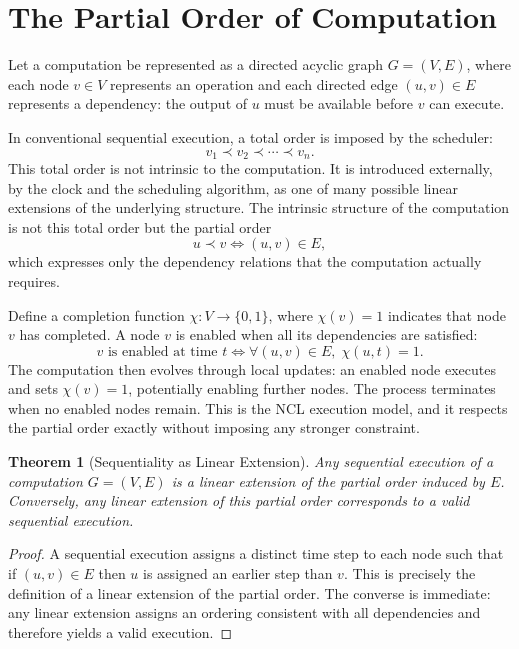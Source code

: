 \documentclass[12pt,a4paper,openany]{book}
\theoremstyle{plain}
\newtheorem{theorem}{Theorem}[chapter]
\theoremstyle{definition}
\theoremstyle{remark}
\begin{document}
\section{The Partial Order of Computation}

Let a computation be represented as a directed acyclic graph $G = (V, E)$, where each node $v \in V$ represents an operation and each directed edge $(u, v) \in E$ represents a dependency: the output of $u$ must be available before $v$ can execute.

In conventional sequential execution, a total order is imposed by the scheduler:
\[
v_1 \prec v_2 \prec \cdots \prec v_n.
\]
This total order is not intrinsic to the computation. It is introduced externally, by the clock and the scheduling algorithm, as one of many possible linear extensions of the underlying structure. The intrinsic structure of the computation is not this total order but the partial order
\[
u \prec v \iff (u, v) \in E,
\]
which expresses only the dependency relations that the computation actually requires.

Define a completion function $\chi : V \to \{0, 1\}$, where $\chi(v) = 1$ indicates that node $v$ has completed. A node $v$ is enabled when all its dependencies are satisfied:
\[
v \text{ is enabled at time } t \iff \forall (u, v) \in E,\; \chi(u, t) = 1.
\]
The computation then evolves through local updates: an enabled node executes and sets $\chi(v) = 1$, potentially enabling further nodes. The process terminates when no enabled nodes remain. This is the NCL execution model, and it respects the partial order exactly without imposing any stronger constraint.

\begin{theorem}[Sequentiality as Linear Extension]
\label{thm:linear_extension}
Any sequential execution of a computation $G = (V, E)$ is a linear extension of the partial order induced by $E$. Conversely, any linear extension of this partial order corresponds to a valid sequential execution.
\end{theorem}

\begin{proof}
A sequential execution assigns a distinct time step to each node such that if $(u, v) \in E$ then $u$ is assigned an earlier step than $v$. This is precisely the definition of a linear extension of the partial order. The converse is immediate: any linear extension assigns an ordering consistent with all dependencies and therefore yields a valid execution.
\end{proof}
\end{document}
